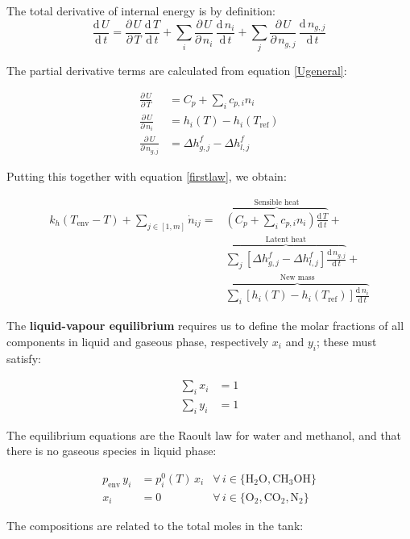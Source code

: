 \documentclass[a4paper]{article}
\renewcommand{\d}{\ensuremath{\mathrm{d}}}
\newcommand{\der}[2]{\ensuremath{\frac{\d \, #1}{\d \, #2}}}
\newcommand{\pder}[2]{\ensuremath{\frac{\partial \, #1}{\partial \, #2}}}
\begin{document}
The total derivative of internal energy is by definition:
\begin{equation}
\label{totalDerU}
\der{U}{t} = \pder{U}{T}\,\der{T}{t} + \sum_i \pder{U}{n_i}\,\der{n_i}{t} +
\sum_j \pder{U}{n_{g,j}}\,\der{n_{g,j}}{t}
\end{equation}

The partial derivative terms are calculated from equation \ref{Ugeneral}:

\begin{align}
\pder{U}{T} & = C_p + \sum_i c_{p,i} n_i\\
\pder{U}{n_i} & = h_i(T) - h_i(T_\text{ref})\\
\pder{U}{n_{g,j}} & = \Delta h _{g,j}^f - \Delta h _{l,j}^f
\end{align}

Putting this together with equation \ref{firstlaw}, we obtain:

\begin{equation}
\boxed{ \begin{aligned}
k_h ( T_\text{env} - T ) + \sum_{j \in [1, m]} \dot n_{ij} = &
\overbrace{\left ( C_p + \sum_i c_{p,i} n_i \right) \der{T}{t} }
^\text{Sensible heat} +\\
& \overbrace{\sum_j [ \Delta h _{g,j}^f - \Delta h _{l,j}^f ] \der{n_{g,j}}{t}}
^\text{Latent heat} +\\
& \overbrace{ \sum_i [ h_i(T) - h_i(T_\text{ref}) ] \der{n_i}{t} }
^\text{New mass}
\end{aligned} }
\end{equation}


The \textbf{liquid-vapour equilibrium} requires us to define the molar fractions
of all components in liquid and gaseous phase, respectively $x_i$ and $y_i$;
these must satisfy:

\begin{align}
\sum_i x_i &= 1\\
\sum_i y_i &= 1
\end{align}

The equilibrium equations are the Raoult law for water and methanol, and that
there is no gaseous species in liquid phase:

\begin{align}
p_\text{env} \, y_i &= p^0_i(T) \, x_i & \forall \, i \in \lbrace \mathrm{H_2O, CH_3OH} \rbrace\\
x_i &= 0 & \forall \, i \in \lbrace \mathrm{O_2, CO_2, N_2} \rbrace
\end{align}

The compositions are related to the total moles in the tank:
\end{document}
